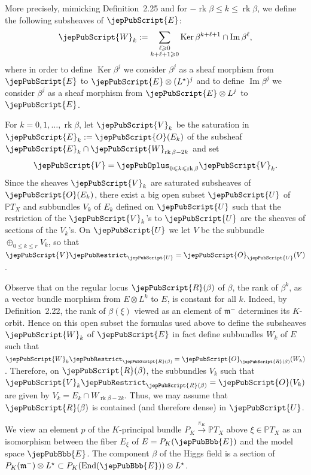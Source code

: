 More precisely, mimicking Definition~2.25 and for $-\operatorname{rk}\beta\leqslant k\leqslant\operatorname{rk}\beta$, we define the following subsheaves of $\jepPubScript{E}$:
\[
\jepPubScript{W}_k:=\sum_{\substack{\ell\geqslant0\\k+\ell+1\geqslant0}}\operatorname{Ker}\beta^{k+\ell+1}\cap\operatorname{Im}\beta^\ell,
\]
where in order to define $\operatorname{Ker}\beta^j$ we consider $\beta^j$ as a sheaf morphism from $\jepPubScript{E}$ to $\jepPubScript{E}\otimes(L^\star)^j$ and to define $\operatorname{Im}\beta^j$ we consider $\beta^j$ as a sheaf morphism from $\jepPubScript{E}\otimes L^j$ to $\jepPubScript{E}$.

For $k=0,1,\ldots,\operatorname{rk}\beta$, let $\jepPubScript{V}_k$ be the saturation in $\jepPubScript{E}_k:=\jepPubScript{O}(E_k)$ of the subsheaf $\jepPubScript{E}_k\cap\jepPubScript{W}_{\operatorname{rk}\beta-2k}$ and set
\[
\jepPubScript{V}=\jepPubOplus_{0\leqslant k\leqslant\operatorname{rk}\beta}\jepPubScript{V}_k.
\]
Since the sheaves $\jepPubScript{V}_k$ are saturated subsheaves of $\jepPubScript{O}(E_k)$, there exist a big open subset $\jepPubScript{U}$ of $\mathbb PT_X$ and subbundles $V_k$ of $E_k$ defined on $\jepPubScript{U}$ such that the restriction of the $\jepPubScript{V}_k$'s to $\jepPubScript{U}$ are the sheaves of sections of the $V_k$'s. On $\jepPubScript{U}$ we let $V$ be the subbundle $\oplus_{0\leqslant k\leqslant r}V_k$, so that $\jepPubScript{V}\jepPubRestrict_{\jepPubScript{U}}=\jepPubScript{O}_{\jepPubScript{U}}(V)$.

Observe that on the regular locus $\jepPubScript{R}(\beta)$ of $\beta$, the rank of $\beta^k$, as a vector bundle morphism from $E\otimes L^k$ to $E$, is constant for all $k$. Indeed, by Definition~2.22, the rank of $\beta(\xi)$ viewed as an element of $\mathfrak m^-$ determines its $K$-orbit. Hence on this open subset the formulas used above to define the subsheaves $\jepPubScript{W}_k$ of $\jepPubScript{E}$ in fact define subbundles $W_k$ of $E$ such that $\jepPubScript{W}_k\jepPubRestrict_{\jepPubScript{R}(\beta)}=\jepPubScript{O}_{\jepPubScript{R}(\beta)}(W_k)$. Therefore, on $\jepPubScript{R}(\beta)$, the subbundles $V_k$ such that $\jepPubScript{V}_k\jepPubRestrict_{\jepPubScript{R}(\beta)}=\jepPubScript{O}(V_k)$ are given by $V_k=E_k\cap W_{\operatorname{rk}\beta-2k}$. Thus, we may assume that $\jepPubScript{R}(\beta)$ is contained (and therefore dense) in $\jepPubScript{U}$.

We view an element $p$ of the $K$-principal bundle $P_K\overset{\pi_K}{\longrightarrow}\mathbb PT_X$ above $\xi\in\mathbb PT_X$ as an isomorphism between the fiber $E_\xi$ of $E=P_K(\jepPubBbb{E})$ and the model space $\jepPubBbb{E}$. The component $\beta$ of the Higgs field is a section of $P_K(\mathfrak m^-)\otimes L^\star\subset P_K(\operatorname{End}(\jepPubBbb{E}))\otimes L^\star$.

